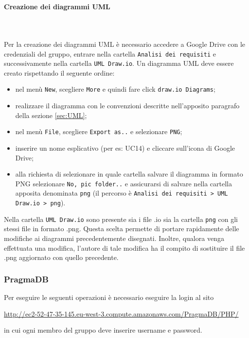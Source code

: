 \paragraph{Creazione dei diagrammi UML} \mbox{}\\ \mbox{}\\
Per la creazione dei diagrammi UML\glo{} è necessario accedere a Google Drive 
con le credenziali del gruppo, entrare nella cartella \texttt{Analisi dei requisiti} e 
successivamente nella cartella \texttt{UML Draw.io}. Un diagramma UML deve essere creato
rispettando il seguente ordine:
	\begin{itemize}
		\item nel menù \texttt{New}, scegliere \texttt{More} e quindi fare
			click \texttt{draw.io Diagrams};
		\item realizzare il diagramma con le convenzioni descritte nell'apposito
			paragrafo della sezione \ref{sec:UML}; 
		\item nel menù \texttt{File}, scegliere \texttt{Export as..} e selezionare \texttt{PNG};
		\item inserire un nome esplicativo (per es: UC14) e cliccare sull'icona di
			Google Drive;
		\item alla richiesta di selezionare in quale cartella salvare il diagramma 
			in formato PNG selezionare \texttt{No, pic folder..} e assicurarsi di salvare 
			nella cartella apposita denominata \texttt{png} (il percorso è 
			\texttt{Analisi dei requisiti > UML Draw.io > png}).
	\end{itemize}
Nella cartella \texttt{UML Draw.io} sono presente sia i file .io sia la cartella \texttt{png}
con gli stessi file in formato .png. Questa scelta permette di portare rapidamente 
delle modifiche ai diagrammi precedentemente disegnati. Inoltre, qualora venga 
effettuata una modifica, l'autore di tale modifica ha il compito di sostituire
il file .png aggiornato con quello precedente. 

\subsubsection{PragmaDB} 
Per eseguire le seguenti operazioni è necessario eseguire la login al sito \\
\centerline{\url{http://ec2-52-47-35-145.eu-west-3.compute.amazonaws.com/PragmaDB/PHP/}}
in cui ogni membro del gruppo deve inserire username e password.

